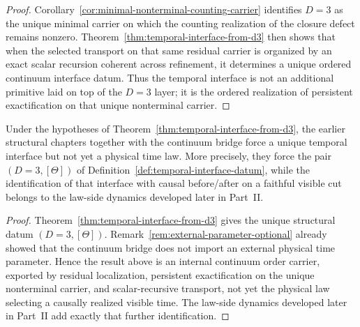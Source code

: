 \begin{proof}
Corollary~\ref{cor:minimal-nonterminal-counting-carrier} identifies \(D=3\) as
the unique minimal carrier on which the counting realization of the closure
defect remains nonzero. Theorem~\ref{thm:temporal-interface-from-d3} then shows
that when the selected transport on that same residual carrier is organized by
an exact scalar recursion coherent across refinement, it determines a unique
ordered continuum interface datum. Thus the temporal interface is not an
additional primitive laid on top of the \(D=3\) layer; it is the ordered
realization of persistent exactification on that unique nonterminal carrier.
\end{proof}

\begin{corollary}
\label{cor:temporal-interface-precedes-physical-time}
Under the hypotheses of
Theorem~\ref{thm:temporal-interface-from-d3}, the earlier structural chapters
together with the continuum bridge force a unique
temporal interface but not yet a physical time law. More precisely, they force
the pair \((D=3,[\Theta])\) of
Definition~\ref{def:temporal-interface-datum}, while the identification of
that interface with causal before/after on a faithful visible cut belongs to
the law-side dynamics developed later in Part~II.
\end{corollary}

\begin{proof}
Theorem~\ref{thm:temporal-interface-from-d3} gives the unique structural datum
\((D=3,[\Theta])\). Remark~\ref{rem:external-parameter-optional} already
showed that the continuum bridge does not import an external physical time
parameter. Hence the result above is an internal continuum order carrier,
exported by residual localization, persistent exactification on the unique
nonterminal carrier, and scalar-recursive transport, not yet the physical law
selecting a causally realized visible time. The law-side dynamics developed
later in Part~II add exactly that further
identification.
\end{proof}

